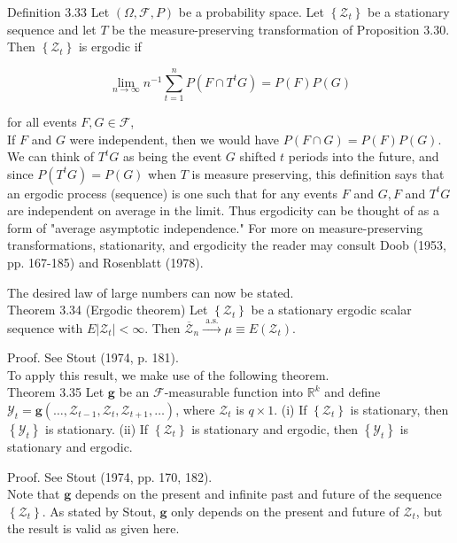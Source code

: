 \documentclass[10pt]{article}
\begin{document}
Definition 3.33 Let $(\Omega, \mathcal{F}, P)$ be a probability space. Let $\left\{\mathcal{Z}_{t}\right\}$ be a stationary sequence and let $T$ be the measure-preserving transformation of Proposition 3.30. Then $\left\{\mathcal{Z}_{t}\right\}$ is ergodic if

$$
\lim _{n \rightarrow \infty} n^{-1} \sum_{t=1}^{n} P\left(F \cap T^{t} G\right)=P(F) P(G)
$$

for all events $F, G \in \mathcal{F}$,\\
If $F$ and $G$ were independent, then we would have $P(F \cap G)=P(F) P(G)$. We can think of $T^{t} G$ as being the event $G$ shifted $t$ periods into the future, and since $P\left(T^{t} G\right)=P(G)$ when $T$ is measure preserving, this definition says that an ergodic process (sequence) is one such that for any events $F$ and $G, F$ and $T^{t} G$ are independent on average in the limit. Thus ergodicity can be thought of as a form of "average asymptotic independence." For more on measure-preserving transformations, stationarity, and ergodicity the reader may consult Doob (1953, pp. 167-185) and Rosenblatt (1978).

The desired law of large numbers can now be stated.\\
Theorem 3.34 (Ergodic theorem) Let $\left\{\mathcal{Z}_{t}\right\}$ be a stationary ergodic scalar sequence with $E\left|\mathcal{Z}_{t}\right|<\infty$. Then $\overline{\mathcal{Z}}_{n} \xrightarrow{\text { a.s. }} \mu \equiv E\left(\mathcal{Z}_{t}\right)$.

Proof. See Stout (1974, p. 181).\\
To apply this result, we make use of the following theorem.\\
Theorem 3.35 Let $\mathbf{g}$ be an $\mathcal{F}$-measurable function into $\mathbb{R}^{k}$ and define $\mathcal{Y}_{t}=\mathbf{g}\left(\ldots, \mathcal{Z}_{t-1}, \mathcal{Z}_{t}, \mathcal{Z}_{t+1}, \ldots\right)$, where $\mathcal{Z}_{t}$ is $q \times 1$. (i) If $\left\{\mathcal{Z}_{t}\right\}$ is stationary, then $\left\{\mathcal{Y}_{t}\right\}$ is stationary. (ii) If $\left\{\mathcal{Z}_{t}\right\}$ is stationary and ergodic, then $\left\{\mathcal{Y}_{t}\right\}$ is stationary and ergodic.

Proof. See Stout (1974, pp. 170, 182).\\
Note that $\mathbf{g}$ depends on the present and infinite past and future of the sequence $\left\{\mathcal{Z}_{t}\right\}$. As stated by Stout, $\mathbf{g}$ only depends on the present and future of $\mathcal{Z}_{t}$, but the result is valid as given here.
\end{document}
